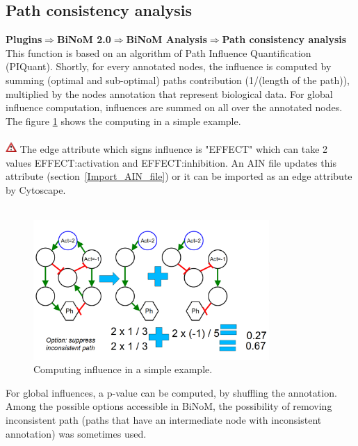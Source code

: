 \subsection{Path consistency analysis}
\textbf{Plugins$\Rightarrow$BiNoM 2.0$\Rightarrow$BiNoM Analysis$\Rightarrow$Path consistency analysis}\\
This function is based on an algorithm of  Path Influence Quantification (PIQuant). Shortly, for every annotated nodes, the influence is computed by summing (optimal and sub-optimal) paths contribution (1/(length of the path)), multiplied by the nodes annotation that represent biological data. For global influence computation, influences are summed on all over the annotated nodes. The figure \ref{PIQuant_example} shows the computing in a simple example.\\\\
\includegraphics[width=12pt,height=12pt]{graphics/warning} The edge attribute which signs influence is "EFFECT" which can take 2 values EFFECT:activation and EFFECT:inhibition. An AIN file updates this attribute (section~\ref{Import_AIN_file}) or it can be imported as an edge attribute by Cytoscape.\\\\
\begin{figure}
\centering
\includegraphics[width=0.8\textwidth]{graphics/PIQuant_example}
\caption{Computing influence in a simple example.}
\label{PIQuant_example}
\end{figure}
For global influences, a p-value can be computed, by shuffling the annotation. Among the possible options accessible in BiNoM, the possibility of removing inconsistent path (paths that have an intermediate node with inconsistent annotation) was sometimes used.\\\\
